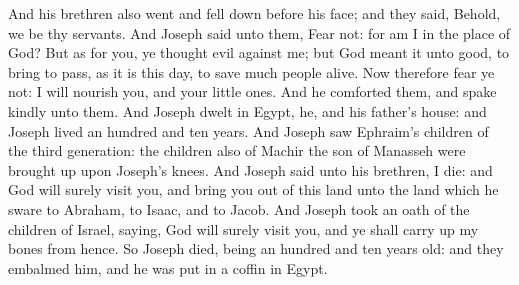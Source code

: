 \begin{biblechapter}
\verse And his brethren also went and fell down before his face; and they said, Behold, we be thy servants.
\verse And Joseph said unto them, Fear not: for am I in the place of God?
\verse But as for you, ye thought evil against me; but God meant it unto good, to bring to pass, as it is this day, to save much people alive.
\verse Now therefore fear ye not: I will nourish you, and your little ones. And he comforted them, and spake kindly unto them.
 And Joseph dwelt in Egypt, he, and his father's house: and Joseph lived an hundred and ten years.
\verse And Joseph saw Ephraim's children of the third generation: the children also of Machir the son of Manasseh were brought up upon Joseph's knees.
\verse And Joseph said unto his brethren, I die: and God will surely visit you, and bring you out of this land unto the land which he sware to Abraham, to Isaac, and to Jacob.
\verse And Joseph took an oath of the children of Israel, saying, God will surely visit you, and ye shall carry up my bones from hence.
\verse So Joseph died, being an hundred and ten years old: and they embalmed him, and he was put in a coffin in Egypt.
\end{biblechapter}
